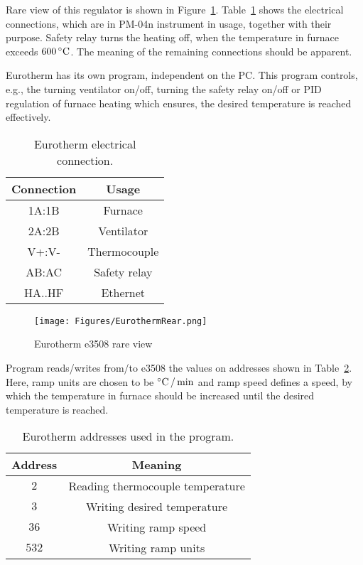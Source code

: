 \documentclass[a4paper,11pt,twoside]{book}
\theoremstyle{named}
\begin{document}
Rare view of this regulator is shown in Figure~\ref{fig:e3508Rare}.
Table~\ref{tab:EurothermConnections} shows the electrical connections, which are
in PM-04n instrument in usage, together with their purpose. Safety relay turns
the heating off, when the temperature in furnace exceeds $600\,^{\circ}{\rm C}$.
The meaning of the remaining connections should be apparent. 

Eurotherm has its own program, independent on the PC. This program
controls, e.g., the turning ventilator on/off, turning the safety relay on/off or PID
regulation of furnace heating which ensures, the desired temperature is reached
effectively.

\begin{table}
  \centering
  \begin{tabular}{c|c}
    \hline
    Connection  & Usage \\
    \hline
    1A:1B        & Furnace \\
    2A:2B        & Ventilator \\
    V+:V-        & Thermocouple \\
    AB:AC        & Safety relay \\
    HA..HF       & Ethernet \\
    \hline
  \end{tabular}
  \caption{Eurotherm electrical connection.}
  \label{tab:EurothermConnections}
\end{table}

\begin{figure}[t]
  \centering
  \texttt{[image: Figures/EurothermRear.png]}
  \caption{Eurotherm e3508 rare view}
  \label{fig:e3508Rare}
\end{figure}

Program reads/writes from/to e3508 the values on addresses shown in
Table~\ref{tab:EurothermAddresses}. Here, ramp units are chosen to be
$^{\circ}{\rm C}\,/\,{\rm min}$ and ramp speed defines a speed, by which
the temperature in furnace should be increased until the desired temperature is
reached. 

\begin{table}
  \centering
  \begin{tabular}{c|c}
    \hline
    Address  & Meaning \\
    \hline
    $2$      & Reading thermocouple temperature \\
    $3$      & Writing desired temperature  \\
    $36$     & Writing ramp speed \\
    $532$    & Writing ramp units \\
    \hline
  \end{tabular}
  \caption{Eurotherm addresses used in the program.}
  \label{tab:EurothermAddresses}
\end{table}
\end{document}
